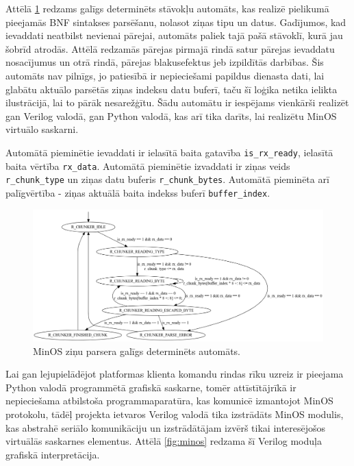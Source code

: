 Attēlā \ref{fig:chunkparser} redzams galīgs determinēts stāvokļu automāts, kas
realizē pielikumā pieejamās BNF sintakses parsēšanu, nolasot ziņas tipu un
datus. Gadījumos, kad ievaddati neatbilst nevienai pārejai, automāts paliek tajā
pašā stāvoklī, kurā jau šobrīd atrodās. Attēlā redzamās pārejas pirmajā rindā
satur pārejas ievaddatu nosacījumus un otrā rindā, pārejas blakusefektus jeb
izpildītās darbības. Šis automāts nav pilnīgs, jo patiesībā ir nepieciešami
papildus dienasta dati, lai glabātu aktuālo parsētās ziņas indeksu datu buferī,
taču šī loģika netika ielikta ilustrācijā, lai to pārāk nesarežģītu. Šādu
automātu ir iespējams vienkārši realizēt gan Verilog valodā, gan Python valodā,
kas arī tika darīts, lai realizētu MinOS virtuālo saskarni.

Automātā pieminētie ievaddati ir ielasītā baita gatavība
\lstinline!is_rx_ready!, ielasītā baita vērtība \lstinline!rx_data!. Automātā
pieminētie izvaddati ir ziņas veids \lstinline!r_chunk_type! un ziņas datu
buferis \lstinline!r_chunk_bytes!. Automātā pieminēta arī palīgvērtība - ziņas
aktuālā baita indekss buferī \lstinline!buffer_index!.

\begin{figure}[H]
    \includegraphics[width=1.0\linewidth]{assets/chunkparser.png}
    \centering
    \caption{MinOS ziņu parsera galīgs determinēts automāts.}
    \label{fig:chunkparser}
\end{figure}

Lai gan lejupielādējot platformas klienta komandu rindas rīku uzreiz ir pieejama
Python valodā programmētā grafiskā saskarne, tomēr attīstītājrīkā ir
nepieciešama atbilstoša programmaparatūra, kas komunicē izmantojot MinOS
protokolu, tādēļ projekta ietvaros Verilog valodā tika izstrādāts MinOS modulis,
kas abstrahē seriālo komunikāciju un izstrādātājam izvērš tikai interesējošos
virtuālās saskarnes elementus. Attēlā \ref{fig:minos} redzama šī Verilog moduļa
grafiskā interpretācija. 

